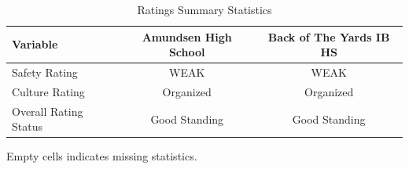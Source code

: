 \begin{table}[H]
\renewcommand{\arraystretch}{1.5}
\caption*{
{\large Ratings Summary Statistics}
} 

\fontsize{10pt}{11pt}\selectfont

\begin{tabular*}{\linewidth}{@{\extracolsep{\fill}}lcc}
\toprule
Variable & Amundsen High School & Back of The Yards IB HS \\ 
\midrule\addlinespace[2.5pt]
Safety Rating & WEAK & WEAK \\
Culture Rating & Organized & Organized \\
Overall Rating Status & Good Standing & Good Standing \\
\bottomrule
\end{tabular*}
\begin{minipage}{\linewidth}
Empty cells indicates missing statistics.\\
\end{minipage}
\end{table}
